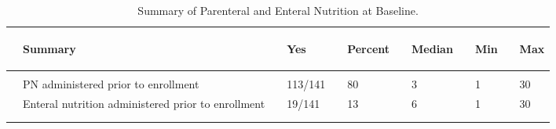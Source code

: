 \documentclass[dvips, 10pt]{article}
\begin{document}
\begin{table}[t]
\caption
{ Summary of Parenteral and Enteral Nutrition at Baseline. }
\begin{center}
\begin{tabular}{ l
lp{1.5em}lp{1.5em}lp{1.5em}lp{1.5em}lp{1.5em}l
}
\hline

& \parbox{0em}{\begin{center}Summary\end{center}} && \parbox{0em}{\begin{center}Yes\end{center}} && \parbox{0em}{\begin{center}Percent\end{center}} && \parbox{0em}{\begin{center}Median\end{center}} && \parbox{0em}{\begin{center}Min\end{center}} && \parbox{0em}{\begin{center}Max\end{center}} \\

\hline

\\
& PN administered prior to enrollment && 113/141 && 80 && 3 && 1 && 30 \\
& Enteral nutrition administered prior to enrollment && 19/141 && 13 && 6 && 1 && 30 \\
\\
\hline \\

\end{tabular}

\end{center}
 \end{table}
\end{document}
